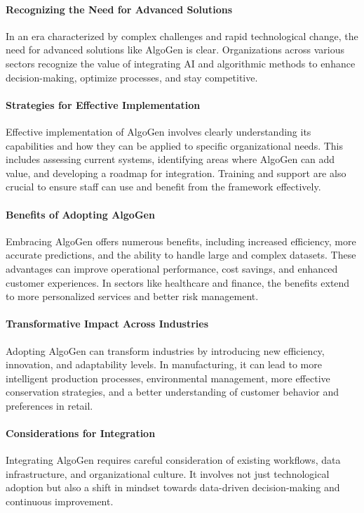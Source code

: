 \documentclass{article}
\begin{document}
\paragraph{Recognizing the Need for Advanced Solutions}
In an era characterized by complex challenges and rapid technological change, the need for advanced solutions like AlgoGen is clear. Organizations across various sectors recognize the value of integrating AI and algorithmic methods to enhance decision-making, optimize processes, and stay competitive.

\paragraph{Strategies for Effective Implementation}
Effective implementation of AlgoGen involves clearly understanding its capabilities and how they can be applied to specific organizational needs. This includes assessing current systems, identifying areas where AlgoGen can add value, and developing a roadmap for integration. Training and support are also crucial to ensure staff can use and benefit from the framework effectively.

\paragraph{Benefits of Adopting AlgoGen}
Embracing AlgoGen offers numerous benefits, including increased efficiency, more accurate predictions, and the ability to handle large and complex datasets. These advantages can improve operational performance, cost savings, and enhanced customer experiences. In sectors like healthcare and finance, the benefits extend to more personalized services and better risk management.

\paragraph{Transformative Impact Across Industries}
Adopting AlgoGen can transform industries by introducing new efficiency, innovation, and adaptability levels. In manufacturing, it can lead to more intelligent production processes, environmental management, more effective conservation strategies, and a better understanding of customer behavior and preferences in retail.

\paragraph{Considerations for Integration}
Integrating AlgoGen requires careful consideration of existing workflows, data infrastructure, and organizational culture. It involves not just technological adoption but also a shift in mindset towards data-driven decision-making and continuous improvement.
\end{document}
